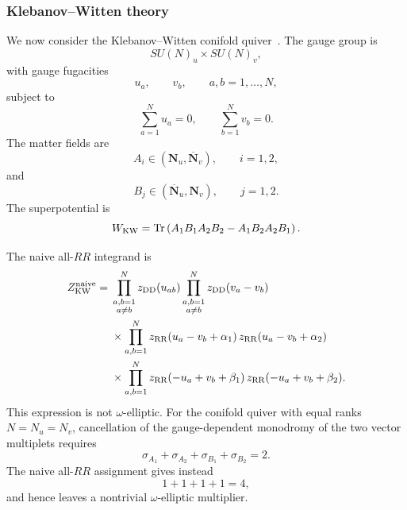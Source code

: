\documentclass[11pt,a4paper]{article}
\numberwithin{equation}{section}
\theoremstyle{plain}
\theoremstyle{definition}
\theoremstyle{remark}
\begin{document}
\subsubsection{Klebanov--Witten theory}
We now consider the Klebanov--Witten conifold quiver~\cite{Klebanov:1998hh}.  The gauge group is
\begin{equation}
SU(N)_u\times SU(N)_v,
\end{equation}
with gauge fugacities
\begin{equation}
u_a,\qquad v_b,\qquad a,b=1,\ldots,N,
\end{equation}
subject to
\begin{equation}
\sum_{a=1}^{N}u_a=0,
\qquad
\sum_{b=1}^{N}v_b=0.
\label{eq:KW-SU-constraints-simple}
\end{equation}
The matter fields are
\begin{equation}
A_i\in(\mathbf N_u,\overline{\mathbf N}_v),
\qquad i=1,2,
\end{equation}
and
\begin{equation}
B_j\in(\overline{\mathbf N}_u,\mathbf N_v),
\qquad j=1,2.
\end{equation}
The superpotential is
\begin{equation}
W_{\rm KW}
=
\operatorname{Tr}
\left(
A_1B_1A_2B_2
-
A_1B_2A_2B_1
\right).
\label{eq:KW-superpotential-simple}
\end{equation}

The naive all-\(RR\) integrand is
\begin{align}
Z_{\rm KW}^{\rm naive}
={}&
\prod_{\substack{a,b=1\\a\neq b}}^{N}
z_{\rm DD}(u_{ab})
\prod_{\substack{a,b=1\\a\neq b}}^{N}
z_{\rm DD}(v_a-v_b)
\nonumber\\
&\times
\prod_{a,b=1}^{N}
z_{\rm RR}(u_a-v_b+\alpha_1)\,
z_{\rm RR}(u_a-v_b+\alpha_2)
\nonumber\\
&\times
\prod_{a,b=1}^{N}
z_{\rm RR}(-u_a+v_b+\beta_1)\,
z_{\rm RR}(-u_a+v_b+\beta_2).
\label{eq:KW-naive-all-RR}
\end{align}
This expression is not \(\omega\)-elliptic.  For the conifold quiver with equal ranks
\(N=N_u=N_v\), cancellation of the gauge-dependent monodromy of the two vector
multiplets requires
\begin{equation}
\sigma_{A_1}+\sigma_{A_2}+\sigma_{B_1}+\sigma_{B_2}=2.
\label{eq:KW-SV-condition}
\end{equation}
The naive all-\(RR\) assignment gives instead
\begin{equation}
1+1+1+1=4,
\end{equation}
and hence leaves a nontrivial \(\omega\)-elliptic multiplier.
\end{document}

